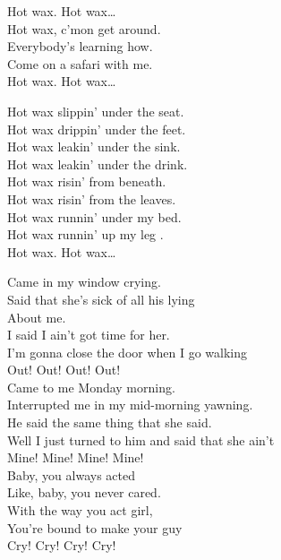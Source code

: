 Hot wax. Hot wax… \\

Hot wax, c'mon get around. \\
Everybody's learning how. \\
Come on a safari with me. \\

Hot wax. Hot wax… \\


Hot wax slippin' under the seat. \\
Hot wax drippin' under the feet. \\
Hot wax leakin' under the sink. \\
Hot wax leakin' under the drink. \\

Hot wax risin' from beneath. \\
Hot wax risin' from the leaves. \\
Hot wax runnin' under my bed. \\
Hot wax runnin' up my leg . \\

Hot wax. Hot wax… \\





Came in my window crying. \\
Said that she's sick of all his lying \\
About me. \\
I said I ain't got time for her. \\
I'm gonna close the door when I go walking \\
Out! Out! Out! Out! \\

Came to me Monday morning. \\
Interrupted me in my mid-morning yawning. \\
He said the same thing that she said. \\
Well I just turned to him and said that she ain't \\
Mine! Mine! Mine! Mine! \\

Baby, you always acted \\
Like, baby, you never cared. \\
With the way you act girl, \\
You're bound to make your guy \\
Cry! Cry! Cry! Cry! \\

